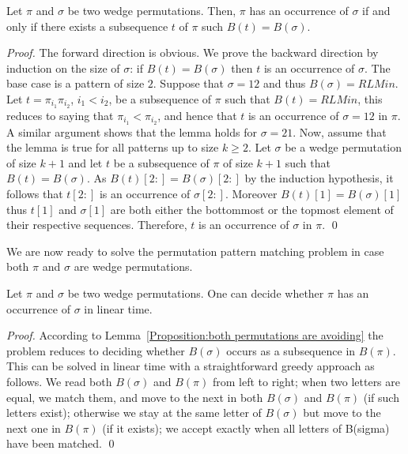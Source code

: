 \documentclass[a4paper]{llncs}
\newcommand{\bijection}{B}
\begin{document}
\begin{lemma}
\label{lemma:MatchStripeToPermutation}
Let $\pi$ and $\sigma$ be two wedge permutations.
Then, $\pi$ has an occurrence of $\sigma$ if and only if
there exists a subsequence $t$ of $\pi$ such $\bijection(t)=\bijection(\sigma)$.
\end{lemma}

\begin{proof} %
The forward direction is obvious.
We prove the backward direction by induction on the size of
$\sigma$: if $\bijection(t)=\bijection(\sigma)$ then $t$ is an occurrence of $\sigma$.
The base case is a pattern of size $2$.
Suppose that $\sigma = 12$ and thus $\bijection(\sigma) = RLMin$.
Let $t = \pi_{i_1}\pi_{i_2}$, $i_1 < i_2$, be a subsequence of $\pi$
such that $\bijection(t) = RLMin$, this reduces to saying that
$\pi_{i_1} < \pi_{i_2}$,
and hence that $t$ is an occurrence of $\sigma = 12$ in $\pi$.
A similar argument shows that the lemma holds for $\sigma = 21$.
Now, assume that the lemma is true for all patterns up to size $k \geq 2$.
Let $\sigma$ be a wedge permutation of size $k+1$ and
let $t$
be a subsequence of $\pi$ of size $k+1$ such that
$\bijection(t) = \bijection(\sigma)$.
As $\bijection(t)[2:] = \bijection(\sigma)[2:]$
by the induction hypothesis, it follows that
$t[2:]$ is an occurrence of $\sigma[2:]$.
Moreover $\bijection(t)[1] = \bijection(\sigma)[1]$
thus $t[1]$ and $\sigma[1]$ are both either the bottommost or the topmost
element of their respective sequences.
Therefore, $t$ is an occurrence of $\sigma$ in $\pi$.
\qed
\end{proof}

We are now ready to solve the permutation pattern matching problem in case
both $\pi$ and $\sigma$ are wedge permutations.

\begin{proposition}
\label{Proposition:both permutations are avoiding}
Let $\pi$ and $\sigma$ be two wedge permutations.
One can decide whether $\pi$ has an occurrence of $\sigma$ in linear time.
\end{proposition}

\begin{proof}
According to Lemma~\ref{Proposition:both permutations are avoiding} the problem reduces
to deciding whether $\bijection(\sigma)$ occurs as a subsequence in $\bijection(\pi)$.
This can be solved in linear time with a straightforward greedy approach as follows.
We read both $\bijection(\sigma)$ and $\bijection(\pi)$ from left to right;
when two letters are equal, we match them, and move to the next in both
$\bijection(\sigma)$ and $\bijection(\pi)$ (if such letters exist);
otherwise we stay at the same letter of $\bijection(\sigma)$
but move to the next one in $\bijection(\pi)$ (if it exists);
we accept exactly when all letters of B(sigma) have been matched.
\qed
\end{proof}
\end{document}
